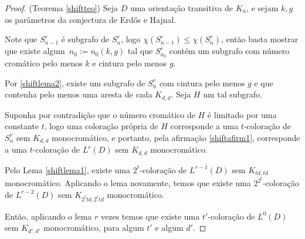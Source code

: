 \begin{proof}(Teorema \ref{shiftteo})
Seja $D$ uma orientação transitiva de $K_n$, e sejam $k,g$ os parâmetros da conjectura de Erd\H{o}s e Hajnal. %

Note que $S_{n-1}^r$ é subgrafo de $S_n^r$, logo $\chi(S_{n-1}^r) \leq \chi(S_n^r)$, então basta mostrar que existe algum~$n_0 := n_0(k,g)$ tal que $S_{n_0}^r$ contém um subgrafo com número cromático pelo menos $k$ e cintura pelo menos $g$.

Por \ref{shiftlema2}, existe um subgrafo de $S_n^r$ com cintura pelo menos $g$ e que contenha pelo menos uma aresta de cada $K_{d,d}$. Seja $H$ um tal subgrafo.

Suponha por contradição que o número cromático de $H$ é limitado por uma constante $t$, logo uma coloração própria de $H$ corresponde a uma $t$-coloração de $S_n^r$ sem $K_{d,d}$ monocromático, e portanto, pela afirmação \ref{shiftafirm1}, corresponde a uma $t$-coloração de $L^r(D)$ sem $K_{d,d}$ monocromático.

Pelo Lema \ref{shiftlema1}, existe uma $2^t$-coloração de $L^{r-1}(D)$ sem $K_{td,td}$ monocromático. Aplicando o lema novamente, temos que existe uma $2^{2^t}$-coloração de $L^{r-2}(D)$ sem $K_{2^ttd,2^ttd}$ monocromático.

Então, aplicando o lema $r$ vezes temos que existe uma $t'$-coloração de $L^0(D)$ sem $K_{d',d'}$ monocromático, para algum $t'$ e algum $d'$. 


\end{proof}
